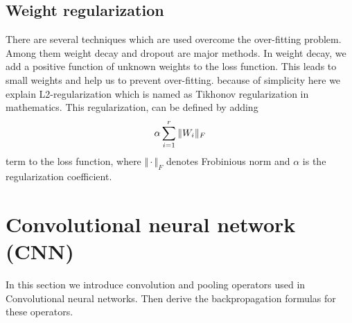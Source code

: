 \documentclass[10pt]{SelfArx} %
\begin{document}
\subsection{Weight regularization}
There are several techniques which are used overcome the over-fitting problem. Among them weight decay and dropout are major methods. In weight decay, we add a positive function of unknown weights to the loss function. This leads to small weights and help us to prevent over-fitting. because of simplicity here we explain L2-regularization which is named as Tikhonov regularization in mathematics.
This regularization, can be defined by adding 
\begin{equation}
\centering
\alpha \sum_{i=1}^r \Vert W_i \Vert_F
\end{equation}
term to the loss function, where $\Vert \cdot \Vert_F$ denotes Frobinious norm and $\alpha$ is the regularization coefficient.

\section{Convolutional neural network (CNN)}
In this section we introduce convolution and pooling operators used in Convolutional neural networks. Then derive the backpropagation formulas for these operators. 
\end{document}
